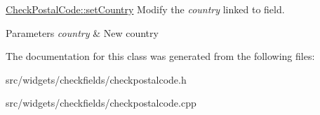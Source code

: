 \hyperlink{classCheckPostalCode_ac82e538c932bd9165d3d40ea949baa4b}{Check\+Postal\+Code\+::set\+Country} Modify the {\itshape country} linked to field. 


\begin{DoxyParams}{Parameters}
{\em country} & New country \\
\hline
\end{DoxyParams}


The documentation for this class was generated from the following files\+:\begin{DoxyCompactItemize}
\item 
src/widgets/checkfields/checkpostalcode.\+h\item 
src/widgets/checkfields/checkpostalcode.\+cpp\end{DoxyCompactItemize}
